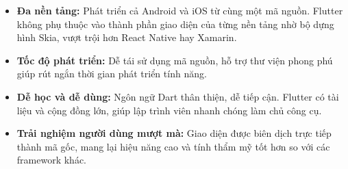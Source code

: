 \begin{itemize}
    \item \textbf{Đa nền tảng:} Phát triển cả Android và iOS từ cùng một mã nguồn. Flutter không phụ thuộc vào thành phần giao diện của từng nền tảng nhờ bộ dựng hình Skia, vượt trội hơn React Native hay Xamarin.
    \item \textbf{Tốc độ phát triển:} Dễ tái sử dụng mã nguồn, hỗ trợ thư viện phong phú giúp rút ngắn thời gian phát triển tính năng.
    \item \textbf{Dễ học và dễ dùng:} Ngôn ngữ Dart thân thiện, dễ tiếp cận. Flutter có tài liệu và cộng đồng lớn, giúp lập trình viên nhanh chóng làm chủ công cụ.
    \item \textbf{Trải nghiệm người dùng mượt mà:} Giao diện được biên dịch trực tiếp thành mã gốc, mang lại hiệu năng cao và tính thẩm mỹ tốt hơn so với các framework khác.
\end{itemize}
